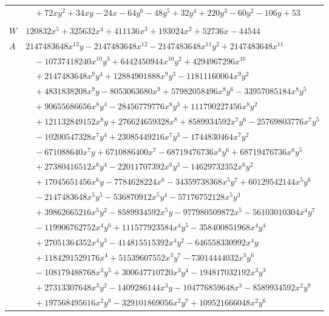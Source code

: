 \documentclass[11pt]{article}
\begin{document}
\begin{longtable}{@{}ll@{}}
 & $\quad +72xy^{2}+34xy-24x-64y^{6}-48y^{5}+32y^{4}+220y^{3}-60y^{2}-106y+53$\\
\addlinespace[3pt]
\multicolumn{2}{@{}l}{$i=39$, $m=4096$, neighbours $4,6,7,9,10,12,16,19,25,34,37,40$}\\
$W$ & $120832x^{5}+325632x^{4}+411136x^{3}+193024x^{2}+52736x-44544$\\
$A$ & $2147483648x^{12}y-2147483648x^{12}-2147483648x^{11}y^{2}+2147483648x^{11}$\\
 & $\quad -10737418240x^{10}y^{3}+6442450944x^{10}y^{2}+4294967296x^{10}$\\
 & $\quad +2147483648x^{9}y^{4}+12884901888x^{9}y^{3}-11811160064x^{9}y^{2}$\\
 & $\quad +4831838208x^{9}y-8053063680x^{9}+57982058496x^{8}y^{6}-33957085184x^{8}y^{5}$\\
 & $\quad +90655686656x^{8}y^{4}-28456779776x^{8}y^{3}+111790227456x^{8}y^{2}$\\
 & $\quad +121132849152x^{8}y+276624659328x^{8}+8589934592x^{7}y^{6}-25769803776x^{7}y^{5}$\\
 & $\quad -10200547328x^{7}y^{4}+23085449216x^{7}y^{3}-1744830464x^{7}y^{2}$\\
 & $\quad -671088640x^{7}y+6710886400x^{7}-68719476736x^{6}y^{6}+68719476736x^{6}y^{5}$\\
 & $\quad +27380416512x^{6}y^{4}-22011707392x^{6}y^{3}-14629732352x^{6}y^{2}$\\
 & $\quad +17045651456x^{6}y-7784628224x^{6}-34359738368x^{5}y^{7}+60129542144x^{5}y^{6}$\\
 & $\quad -2147483648x^{5}y^{5}-536870912x^{5}y^{4}-57176752128x^{5}y^{3}$\\
 & $\quad +39862665216x^{5}y^{2}-8589934592x^{5}y-977980509872x^{5}-56103010304x^{4}y^{7}$\\
 & $\quad -119906762752x^{4}y^{6}+111577923584x^{4}y^{5}-358400851968x^{4}y^{4}$\\
 & $\quad +27051364352x^{4}y^{3}-414815515392x^{4}y^{2}-646558330992x^{4}y$\\
 & $\quad +1184291529176x^{4}+51539607552x^{3}y^{7}-73014444032x^{3}y^{6}$\\
 & $\quad -108179488768x^{3}y^{5}+300647710720x^{3}y^{4}-194817032192x^{3}y^{3}$\\
 & $\quad +27313307648x^{3}y^{2}-1409286144x^{3}y-104776859648x^{3}-8589934592x^{2}y^{9}$\\
 & $\quad +197568495616x^{2}y^{8}-329101869056x^{2}y^{7}+109521666048x^{2}y^{6}$\\

\end{longtable}
\end{document}
